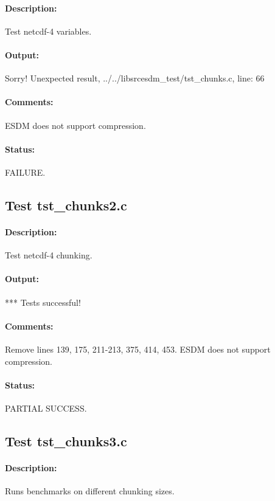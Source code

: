 \paragraph{Description:} Test netcdf-4 variables.

\paragraph{Output:} Sorry! Unexpected result, ../../libsrcesdm\_test/tst\_chunks.c, line: 66

\paragraph{Comments:} ESDM does not support compression.

\paragraph{Status:} FAILURE.

\subsection{Test tst\_chunks2.c}

\paragraph{Description:} Test netcdf-4 chunking.

\paragraph{Output:} *** Tests successful!

\paragraph{Comments:} Remove lines 139, 175, 211-213, 375, 414, 453. ESDM does not support compression.

\paragraph{Status:} PARTIAL SUCCESS.

\subsection{Test tst\_chunks3.c}

\paragraph{Description:} Runs benchmarks on different chunking sizes.

